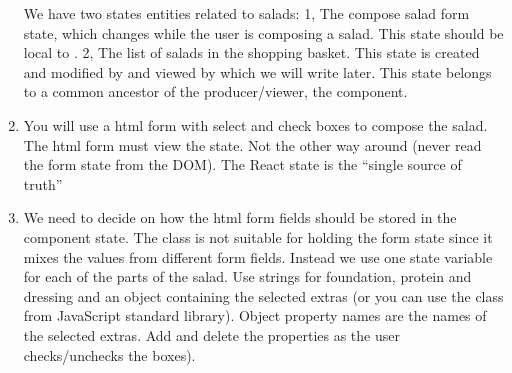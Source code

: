 \documentclass[fleqn, article, a4paper]{memoir}
\begin{document}
\begin{Assignments}
\begin{enumerate}
We have two states entities related to salads: 1, The compose salad form state, which changes while the user is composing a salad. This state should be local to . 2, The list of salads in the shopping basket. This state is created and modified by  and viewed by  which we will write later. This state belongs to a common ancestor of the producer/viewer, the  component.
  
  \item You will use a html form with select and check boxes to compose the salad. The html form must view the  state. Not the other way around (never read the form state from the DOM). The React state is the ``single source of truth''
  
  \item We need to decide on how the html form fields should be stored in the component state. The  class is not suitable for holding the form state since it mixes the values from different form fields. Instead we use one state variable for each of the parts of the salad. Use strings for foundation, protein and dressing and an object containing the selected extras (or you can use the  class from JavaScript standard library). Object property names are the names of the selected extras. Add and delete the properties as the user checks/unchecks the boxes).
  

\end{enumerate}
\end{Assignments}
\end{document}
